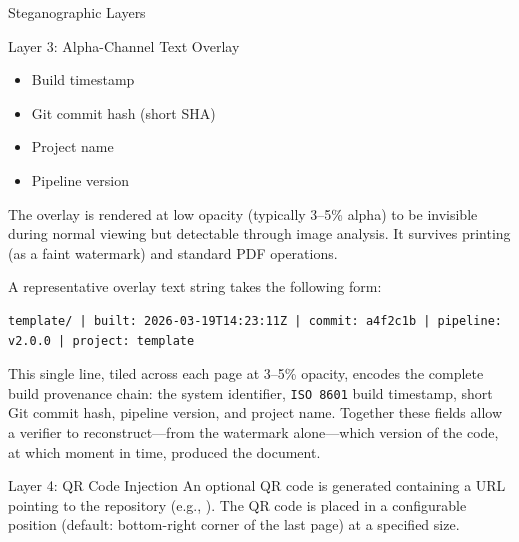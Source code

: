 \documentclass[
  ignorenonframetext,
]{beamer}
\providecommand{\tightlist}{%
  \setlength{\itemsep}{0pt}\setlength{\parskip}{0pt}}
\begin{document}
\begin{frame}{Steganographic Layers}
\begin{block}{Layer 3: Alpha-Channel Text Overlay}
\begin{itemize}
\tightlist
\item
  Build timestamp
\item
  Git commit hash (short SHA)
\item
  Project name
\item
  Pipeline version
\end{itemize}

The overlay is rendered at low opacity (typically 3--5\% alpha) to be
invisible during normal viewing but detectable through image analysis.
It survives printing (as a faint watermark) and standard PDF operations.

A representative overlay text string takes the following form:

\begin{verbatim}
template/ | built: 2026-03-19T14:23:11Z | commit: a4f2c1b | pipeline: v2.0.0 | project: template
\end{verbatim}

This single line, tiled across each page at 3--5\% opacity, encodes the
complete build provenance chain: the system identifier,
\texttt{ISO\ 8601} build timestamp, short Git commit hash, pipeline
version, and project name. Together these fields allow a verifier to
reconstruct---from the watermark alone---which version of the code, at
which moment in time, produced the document.
\end{block}

\begin{block}{Layer 4: QR Code Injection}
\protect{}\label{layer-4-qr-code-injection}
An optional QR code is generated containing a URL pointing to the
repository (e.g., ). The QR code
is placed in a configurable position (default: bottom-right corner of
the last page) at a specified size.
\end{block}
\end{frame}
\end{document}

